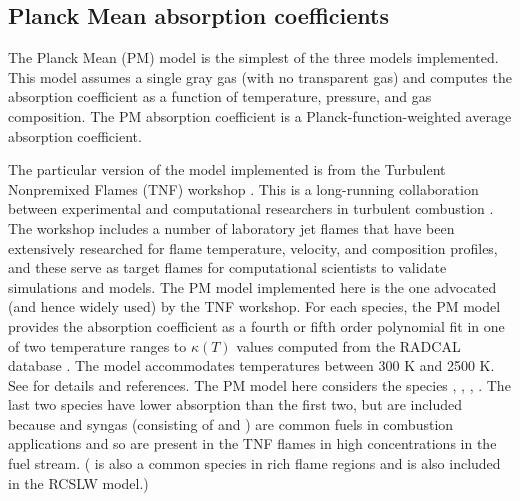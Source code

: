 \documentclass[preprint,12pt]{elsarticle}
\begin{document}
\begin{table}
    \caption{Summary of radiative property models and ranges of applicability. For the WSGG model the pressure range is given in terms of the pressure-path length product.}
\label{t:models}
\centering
{}
\end{table}

\subsection{Planck Mean absorption coefficients} \label{s:planckmean}

The Planck Mean (PM) model is the simplest of the three models implemented. This model assumes a single gray gas (with no transparent gas) and computes the absorption coefficient as a function of temperature, pressure, and gas composition. The PM absorption coefficient is a Planck-function-weighted average absorption coefficient.

The particular version of the model implemented is from the Turbulent Nonpremixed Flames (TNF) workshop \cite{TNF}. This is a long-running collaboration between experimental and computational researchers in turbulent combustion \citep{Smith_2003,Barlow_2001}. The workshop includes a number of laboratory jet flames that have been extensively researched for flame temperature, velocity, and composition profiles, and these serve as target flames for computational scientists to validate simulations and models. The PM model implemented here is the one advocated (and hence widely used) by the TNF workshop. For each species, the PM model provides the absorption coefficient as a fourth or fifth order polynomial fit in one of two temperature ranges to $\kappa(T)$ values computed from the RADCAL database \cite{Grosshandler_1993}. The model accommodates temperatures between 300 K and 2500 K. See \cite{TNF} for details and references. The PM model here considers the species , , , .  The last two species have lower absorption than the first two, but are included because  and syngas (consisting of  and ) are common fuels in combustion applications and so are present in the TNF flames in high concentrations in the fuel stream. ( is also a common species in rich flame regions and is also included in the RCSLW model.)
\end{document}
